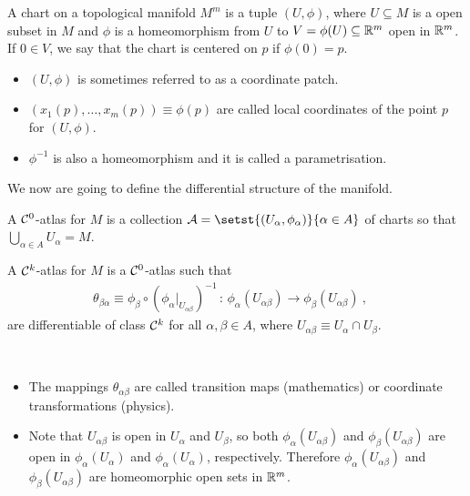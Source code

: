\begin{definition}
	A chart on a topological manifold $M^m$ is a tuple $(U,\phi)$, where $U\subseteq M$ is a open subset in $M$ and $\phi$ is a homeomorphism from $U$ to $V=\phi(U)\subseteq \mathbb R^m$ open in $\mathbb R^m$. If $0\in V$, we say that the chart is centered on $p$ if $\phi(0)=p$.

	\begin{itemize}
		\item $(U,\phi)$ is sometimes referred to as a coordinate patch.
		\item $(x_1(p),\dots,x_m(p))\equiv\phi(p)$ are called local coordinates of the point $p$ for $(U, \phi)$.
		\item $\phi^{-1}$ is also a homeomorphism and it is called a parametrisation.
	\end{itemize}

\end{definition}

We now are going to define the differential structure of the manifold.

\begin{definition}
	A $\mathcal{C}^0$-atlas for $M$ is a collection $\calA = \setst{(U_\alpha, \phi_\alpha)}{\alpha\in A}$ of charts so that $\bigcup_{\alpha\in A} U_\alpha = M$.
\end{definition}

\begin{definition}
	A $\mathcal{C}^k$-atlas for $M$ is a $\mathcal{C}^0$-atlas such that
	\begin{align*}
		\theta_{\beta\alpha} \equiv {\phi_\beta \circ ({\phi_\alpha}\rvert_{U_{\alpha\beta}})^{-1}} \,:\, \phi_\alpha(U_{\alpha\beta}) \to \phi_\beta(U_{\alpha\beta}) ~,\quad
	\end{align*}
	are differentiable of class $\mathcal{C}^k$ for all $\alpha,\beta \in A$, where $U_{\alpha\beta} \equiv U_\alpha \cap U_\beta$.
\end{definition}

\begin{remark}
	~
	\begin{itemize}
		\item The mappings $\theta_{\alpha\beta}$ are called transition maps (mathematics) or coordinate transformations (physics).
		\item Note that $U_{\alpha\beta}$ is open in $U_\alpha$ and $U_\beta$, so both $\phi_\alpha(U_{\alpha\beta})$ and $\phi_\beta(U_{\alpha\beta})$ are open in $\phi_\alpha(U_{\alpha})$ and $\phi_\alpha(U_{\alpha})$, respectively. Therefore $\phi_\alpha(U_{\alpha\beta})$ and $\phi_\beta(U_{\alpha\beta})$ are homeomorphic open sets in $\mathbb R^m$.
	\end{itemize} 
\end{remark}

